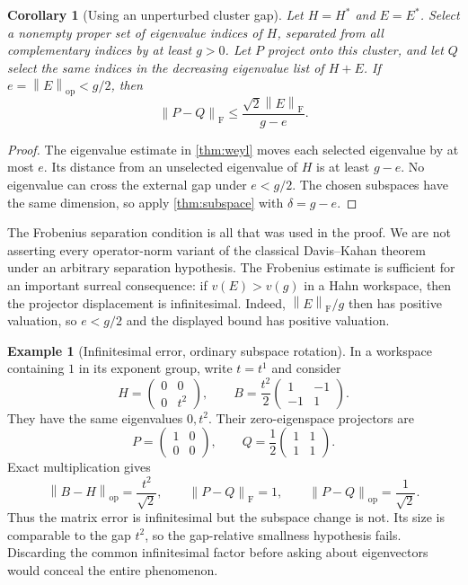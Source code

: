 \documentclass[11pt,a4paper]{article}
\numberwithin{equation}{section}
\newtheorem{corollary}[corollary]{Corollary}
\theoremstyle{definition}
\newtheorem{example}[example]{Example}
\theoremstyle{remark}
\newcommand{\op}{\mathrm{op}}
\newcommand{\Fr}{\mathrm F}
\newcommand{\norm}[1]{\left\lVert#1\right\rVert}
\begin{document}
\begin{corollary}[Using an unperturbed cluster gap]\label{cor:clustergap}
Let $H=H^*$ and $E=E^*$. Select a nonempty proper set of eigenvalue indices of $H$, separated from
all complementary indices by at least $g>0$. Let $P$ project onto this
cluster, and let $Q$ select the same indices in the decreasing eigenvalue
list of $H+E$. If $e=\norm E_{\op}<g/2$, then
\[
 \norm{P-Q}_{\Fr}\le\frac{\sqrt2\norm E_{\Fr}}{g-e}.
\]
\end{corollary}
\begin{proof}
The eigenvalue estimate in \cref{thm:weyl} moves each selected eigenvalue
by at most $e$. Its distance from an unselected eigenvalue of $H$ is at
least $g-e$. No eigenvalue can cross the external gap under $e<g/2$.
The chosen subspaces have the same dimension, so apply
\cref{thm:subspace} with $\delta=g-e$.
\end{proof}

The Frobenius separation condition is all that was used in the proof.
We are not asserting every operator-norm variant of the classical
Davis--Kahan theorem under an arbitrary separation hypothesis. The
Frobenius estimate is sufficient for an important surreal consequence:
if $v(E)>v(g)$ in a Hahn workspace, then the projector displacement is
infinitesimal. Indeed, $\norm E_{\Fr}/g$ then has positive valuation, so
$e<g/2$ and the displayed bound has positive valuation.

\begin{example}[Infinitesimal error, ordinary subspace rotation]\label{ex:rotation}
In a workspace containing $1$ in its exponent group, write $t=t^1$ and consider
\[
 H=\begin{pmatrix}0&0\\0&t^2\end{pmatrix},\qquad
 B=\frac{t^2}{2}\begin{pmatrix}1&-1\\-1&1\end{pmatrix}.
\]
They have the same eigenvalues $0,t^2$. Their zero-eigenspace projectors are
\[
 P=\begin{pmatrix}1&0\\0&0\end{pmatrix},\qquad
 Q=\frac12\begin{pmatrix}1&1\\1&1\end{pmatrix}.
\]
Exact multiplication gives
\[
 \norm{B-H}_{\op}=\frac{t^2}{\sqrt2},\qquad
 \norm{P-Q}_{\Fr}=1,\qquad \norm{P-Q}_{\op}=\frac1{\sqrt2}.
\]
Thus the matrix error is infinitesimal but the subspace change is not.
Its size is comparable to the gap $t^2$, so the gap-relative smallness
hypothesis fails. Discarding the common infinitesimal factor before asking
about eigenvectors would conceal the entire phenomenon.
\end{example}
\end{document}
